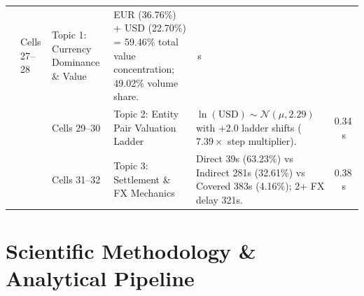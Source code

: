 \documentclass[11pt,a4paper]{article}
\begin{document}
\begin{table}[H]
\begin{tabularx}{\textwidth}{@{}l >{\raggedright\arraybackslash}p{1.4cm} >{\raggedright\arraybackslash}p{1.4cm} >{\raggedright\arraybackslash}p{3.8cm} >{\raggedright\arraybackslash}X c@{}}
  & Cells 27--28 & Topic 1: Currency Dominance \& Value & EUR (36.76\%) + USD (22.70\%) = 59.46\% total value concentration; 49.02\% volume share. & 0.37\,s \\
  & & Cells 29--30 & Topic 2: Entity Pair Valuation Ladder & $\ln(\text{USD}) \sim \mathcal{N}(\mu, 2.29)$ with $+2.0$ ladder shifts ($7.39\times$ step multiplier). & 0.34\,s \\
  & & Cells 31--32 & Topic 3: Settlement \& FX Mechanics & Direct 39s (63.23\%) vs Indirect 281s (32.61\%) vs Covered 383s (4.16\%); 2+ FX delay 321s. & 0.38\,s \\ \bottomrule
\end{tabularx}
\end{table}

\section{Scientific Methodology \& Analytical Pipeline}
\end{document}
